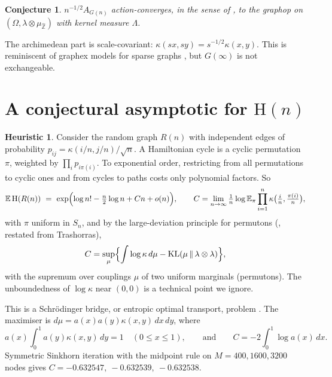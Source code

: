 \documentclass[11pt]{amsart}
\newtheorem{conjecture}[theorem]{Conjecture}
\theoremstyle{definition}
\newtheorem{heuristic}[theorem]{Heuristic}
\newcommand{\Ham}{\mathrm{H}}
\newcommand{\Zhat}{\widehat{\mathbb{Z}}}
\newcommand{\KL}{\mathrm{KL}}
\begin{document}
\begin{conjecture}\label{conj:limit}
$n^{-1/2}A_{G(n)}$ action-converges, in the sense of \cite{BackhauszSzegedy}, to the
graphop on $(\Omega,\lambda\otimes\mu_{\Zhat})$ with kernel measure $\Lambda$.
\end{conjecture}

The archimedean part is scale-covariant: $\kappa(sx,sy)=s^{-1/2}\kappa(x,y)$.
This is reminiscent of graphex models for sparse graphs \cite{VeitchRoy,BCCH}, but
$G(\infty)$ is not exchangeable.

\section{A conjectural asymptotic for $\Ham(n)$}\label{sec:heuristic}

\begin{heuristic}\label{heu:first}
Consider the random graph $R(n)$ with independent edges of probability
$p_{ij}=\kappa(i/n,j/n)/\sqrt n$. A Hamiltonian cycle is a cyclic permutation $\pi$,
weighted by $\prod_i p_{i\pi(i)}$. To exponential order, restricting from all
permutations to cyclic ones and from cycles to paths costs only polynomial factors.
So
\[
\mathbb{E}\,\Ham(R(n))\ =\ \exp\Bigl(\log n!-\tfrac n2\log n+Cn+o(n)\Bigr),
\qquad
C=\lim_{n\to\infty}\tfrac1n\log\mathbb{E}_{\pi}\prod_{i=1}^n\kappa\bigl(\tfrac in,\tfrac{\pi(i)}n\bigr),
\]
with $\pi$ uniform in $S_n$, and by the large-deviation principle for permutons
(\cite[Theorem~1]{KKRW}, restated from Trashorras),
\[
C=\sup_{\mu}\Bigl\{\int\log\kappa\,d\mu-\KL(\mu\,\|\,\lambda\otimes\lambda)\Bigr\},
\]
with the supremum over couplings $\mu$ of two uniform marginals (permutons).
The unboundedness of $\log\kappa$ near $(0,0)$ is a technical point we ignore.
\end{heuristic}

This is a Schr\"odinger bridge, or entropic optimal transport, problem
\cite{Leonard}. The maximiser is $d\mu=a(x)a(y)\kappa(x,y)\,dx\,dy$, where
\[
a(x)\int_0^1 a(y)\kappa(x,y)\,dy=1\quad(0\le x\le1),\qquad\text{and}\qquad C=-2\int_0^1\log a(x)\,dx .
\]
Symmetric Sinkhorn iteration \cite{Sinkhorn} with the midpoint rule on $M=400,1600,3200$
nodes gives
$C=-0.632547,\ -0.632539,\ -0.632538$.
\end{document}
